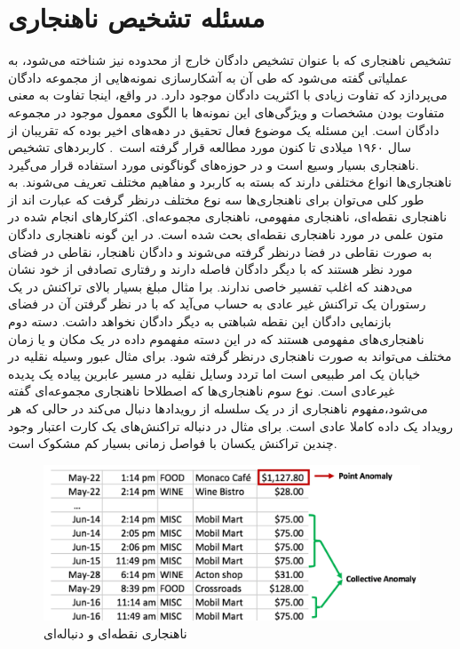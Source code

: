 \documentclass[12pt,a4paper]{report}
\theoremstyle{definition}
\theoremstyle{definition}
\begin{document}
	\section{مسئله تشخیص ناهنجاری}
تشخیص ناهنجاری که با عنوان تشخیص دادگان خارج از محدوده نیز شناخته می‌شود، به عملیاتی گفته می‌شود که طی آن به آشکارسازی نمونه‌هایی از مجموعه دادگان می‌پردازد که تفاوت زیادی با اکثریت دادگان موجود دارد. در واقع، اینجا تفاوت به معنی متفاوت بودن مشخصات و ویژگی‌های این نمونه‌ها با الگوی معمول موجود در مجموعه دادگان است. این مسئله یک موضوع فعال تحقیق در دهه‌های اخیر بوده که تقریبان از سال ۱۹۶۰ میلادی تا کنون مورد مطالعه قرار گرفته است~\cite{Grubbs1969ProceduresFD}. کاربردهای تشخیص ناهنجاری بسیار وسیع است و در حوزه‌های گوناگونی مورد استفاده قرار می‌گیرد.\\

ناهنجاری‌ها انواع مختلفی دارند که بسته به کاربرد و مفاهیم مختلف تعریف می‌شوند. به طور کلی می‌توان برای ناهنجاری‌ها سه نوع مختلف درنظر گرفت که عبارت اند از ناهنجاری نقطه‌ای،‌ ناهنجاری مفهومی‌،‌ ناهنجاری مجموعه‌ای. اکثرکارهای انجام شده در متون علمی در مورد ناهنجاری نقطه‌ای بحث شده است. در این گونه ناهنجاری دادگان به صورت نقاطی در فضا درنظر گرفته می‌شوند و دادگان ناهنجار، نقاطی در فضای مورد نظر هستند که با دیگر دادگان فاصله دارند و رفتاری تصادفی از خود نشان می‌دهند که اغلب تفسیر خاصی ندارند. برا مثال مبلغ بسیار بالای تراکنش در یک رستوران  یک تراکنش غیر عادی به حساب می‌آید که با در نظر گرفتن آن در فضای بازنمایی دادگان این نقطه شباهتی به دیگر دادگان نخواهد داشت. دسته دوم ناهنجاری‌های مفهومی هستند که در این دسته مفهموم داده در یک مکان‌ و یا زمان‌ مختلف می‌تواند به صورت ناهنجاری درنظر گرفته شود. برای مثال عبور وسیله نقلیه در خیابان یک امر طبیعی است اما تردد وسایل نقلیه در مسیر عابرین پیاده یک پدیده غیرعادی است. نوع سوم ناهنجاری‌ها که اصطلاحا ناهنجاری مجموعه‌ای گفته می‌شود،‌مفهوم ناهنجاری از در یک سلسله از رویدادها دنبال می‌کند در حالی که هر رویداد یک داده کاملا عادی است. برای مثال در دنباله تراکنش‌های یک کارت اعتبار وجود چندین تراکنش یکسان با فواصل زمانی بسیار کم مشکوک است.

\begin{figure}[!hp]
	\begin{center}
		\includegraphics[width=0.7\linewidth]{./images/figures/credit-card.png}

		\caption{
		ناهنجاری نقطه‌ای و دنباله‌ای
		\cite{G.Chalapathy}
		}		
		\label{fig:anomaly-example-1}
		\centering
	\end{center}
\end{figure}
\end{document}
